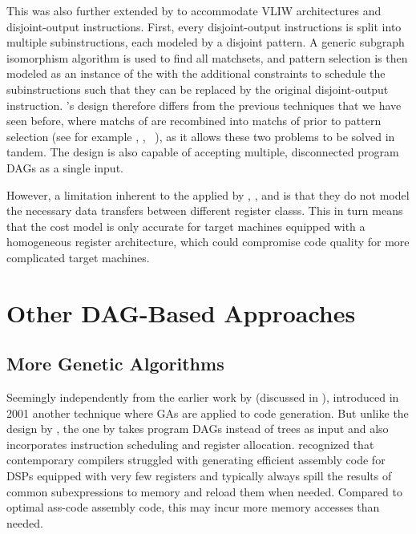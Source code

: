 This \tCPmodel was also further extended by  to accommodate \gls{VLIW} architectures and \glspl{disjoint-output
  instruction}.
%
First, every \glspl{disjoint-output instruction} is split into
multiple \glspl{subinstruction}, each modeled by a disjoint \gls{pattern}.
%
A
generic \gls{subgraph isomorphism} algorithm is used to find all
\glspl{matchset}, and \gls{pattern selection} is then modeled as an instance of
the \tCPmodel with the additional constraints to schedule the
\glspl{subinstruction} such that they can be replaced by the original
\gls{disjoint-output instruction}.
%
\citeauthor{Arslan2013}'s design therefore
differs from the previous techniques that we have seen before, where
\glspl{match} of \tpartialPatterns are recombined into \glspl{match} of
\tcomplexPatterns prior to \gls{pattern selection} (see for example
\textcite{Scharwaechter2007}, \textcite{Ahn2009},
\citeauthor{Arnold1999b}~\cite{Arnold1999a, Arnold1999b, Arnold2001}), as it
allows these two problems to be solved in tandem.
%
The design is also capable of
accepting multiple, disconnected \glspl{program DAG} as a single input.

However, a limitation inherent to the \tCPmodels applied by
\citeauthor{Martin2009}, \citeauthor{Floch2010}, and \citeauthor{Arslan2013} is
that they do not model the necessary data transfers between different
\glspl{register class}.
%
This in turn means that the cost model is only accurate
for \glspl{target machine} equipped with a homogeneous \gls{register}
architecture, which could compromise code quality for more complicated
\glspl{target machine}.


\section{Other DAG-Based Approaches}

\subsection{More Genetic Algorithms}

Seemingly independently from the earlier work by \textcite{Shu1996} (discussed
in ), 
introduced in 2001 another technique where \glsdesc{GA}s are applied to
\gls{code generation}.
%
But unlike the design by \citeauthor{Shu1996}, the one by
\citeauthor{Lorenz2001} takes \glspl{program DAG} instead of \glspl{tree} as
input and also incorporates \gls{instruction scheduling} and \gls{register
  allocation}.
%
\citeauthor{Lorenz2001} recognized that contemporary
\glspl{compiler} struggled with generating efficient \gls{assembly code} for
\glspl{DSP} equipped with very few \glspl{register} and typically always spill
the results of common subexpressions to memory and reload them when needed.
Compared to \gls{optimal ass-code} \gls{assembly code}, this may incur more
memory accesses than needed.

